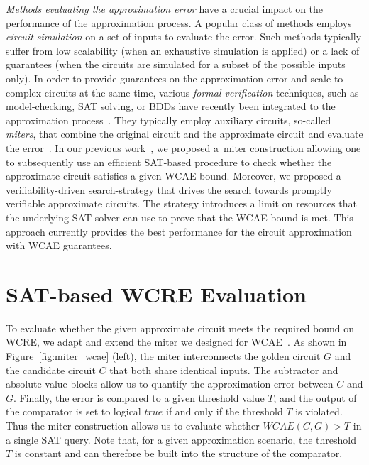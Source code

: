\documentclass[runningheads]{llncs}
\begin{document}
\vspace{0.5em}

\emph{Methods evaluating the approximation error} have a crucial impact on the
performance of the approximation process. A popular class of methods employs
\emph{circuit simulation}  on a set of inputs to evaluate the error. Such
methods typically suffer from low scalability (when an exhaustive simulation is
applied) or a lack of guarantees (when the circuits are simulated for a subset
of the possible inputs only). In order to provide guarantees on the
approximation error and scale to complex circuits at the same time, various
\emph{formal verification} techniques, such as model-checking, SAT solving, or
BDDs have recently been integrated to the approximation
process~\cite{Ciesielski15,Vasicek:DATE17}. They typically employ auxiliary
circuits, so-called \emph{miters}, that combine the original circuit and the
approximate circuit and evaluate the error~\cite{drechsler-DAC'16}. In our
previous work~\cite{iccad17}, we proposed a~miter construction allowing one to
subsequently use an efficient SAT-based procedure to check whether the
approximate circuit satisfies a given WCAE bound. Moreover, we proposed a
verifiability-driven search-strategy that drives the search towards promptly
verifiable approximate circuits. The strategy introduces a limit on resources
that the underlying SAT solver can use to prove that the WCAE bound is met.
This approach currently provides the best performance for the circuit
approximation with WCAE guarantees.



\section{SAT-based WCRE Evaluation}

To evaluate whether the given approximate circuit meets the required bound on
WCRE, we adapt and extend the miter we designed for WCAE~\cite{iccad17}. As
shown in Figure~\ref{fig:miter_wcae} (left), the miter interconnects the golden
circuit $G$ and the candidate circuit $C$ that both share identical inputs. The
subtractor and absolute value blocks allow us to quantify the approximation
error between $C$ and $G$. Finally, the error is compared to a given threshold
value $T$, and the output of the comparator is set to logical $true$ if and only
if the threshold $T$ is violated. Thus the miter construction allows us to
evaluate whether $WCAE(C,G) > T$ in a single SAT query. Note that, for a given
approximation scenario, the threshold $T$ is constant and can therefore be built
into the structure of the comparator.
\end{document}
